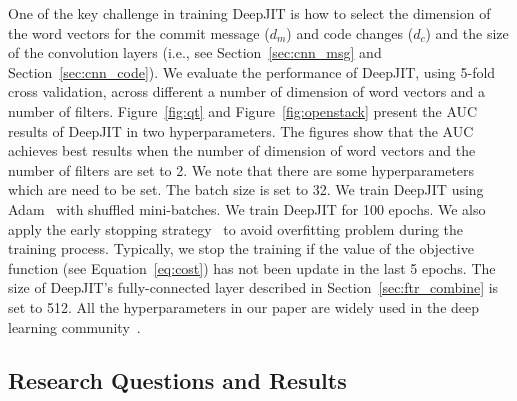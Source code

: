 One of the key challenge in training DeepJIT is how to select the dimension of the word vectors for the commit message ($d_m$) and code changes ($d_c$) and the size of the convolution layers (i.e., see Section~\ref{sec:cnn_msg} and Section~\ref{sec:cnn_code}). We evaluate the performance of DeepJIT, using 5-fold cross validation, across different a number of dimension of word vectors and a number of filters. Figure~\ref{fig:qt} and Figure~\ref{fig:openstack} present the AUC results of DeepJIT in two hyperparameters. The figures show that the AUC achieves best results when the number of dimension of word vectors and the number of filters are set to 2. We note that there are some hyperparameters which are need to be set. The batch size is set to 32. We train DeepJIT using Adam~\cite{kingma2014adam} with shuffled mini-batches. We train DeepJIT for 100 epochs. We also apply the early stopping strategy~\cite{prechelt1998automatic, caruana2001overfitting} to avoid overfitting problem during the training process. Typically, we stop the training if the value of the objective function (see Equation~\ref{eq:cost}) has not been update in the last 5 epochs. The size of DeepJIT's fully-connected layer described in Section~\ref{sec:ftr_combine} is set to 512. All the hyperparameters in our paper are widely used in the deep learning community~\cite{severyn2015learning, huo2016learning, huo2017enhancing, hinton2012improving}. 

 
 

\subsection{Research Questions and Results}
\label{sec:rq_results}

